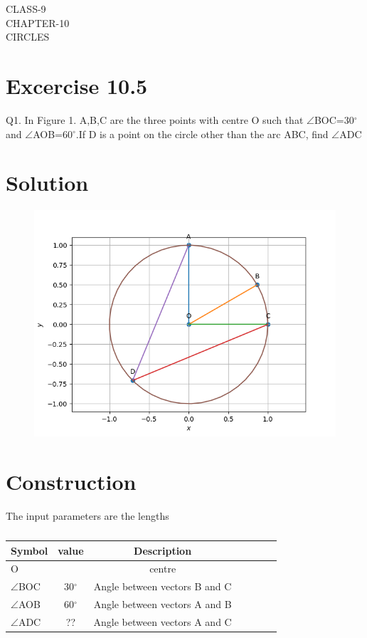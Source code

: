 \documentclass[12pt]{article}
\begin{document}
\begin{center}
\textbf\large{CLASS-9\\CHAPTER-10 \\ CIRCLES}

\end{center}
\section*{Excercise 10.5}

Q1. In Figure 1. A,B,C are the three points with centre O such that $\angle$BOC=30$^\circ$ and $\angle$AOB=60$^\circ$.If D is a point on the circle other than the arc ABC, find $\angle$ADC
\section*{\large Solution}
\begin{figure}[h!]
\centering
\includegraphics[width=\columnwidth]{figs/circle2.png}
\caption{}
\end{figure}
\section*{\large Construction}



The input parameters are the lengths



\begin{table}[htbp]
 \begin{center}
    \begin{tabular}{|l|c|c|c|c|c|c} \hline \textbf{Symbol}
  & \textbf{value} & \textbf{Description} \\
 \hline
O & & centre \\ \hline
$\angle$BOC &30$^\circ$ & Angle between vectors B and C  \\ \hline
$\angle$AOB&60$^\circ$&Angle between vectors A and B\\
	\hline
	$\angle$ADC&??&Angle between vectors A and C \\
	\hline
\end{tabular}   
\end{center}
\caption{\label{table:dummytable} }
\end{table}
\end{document}
